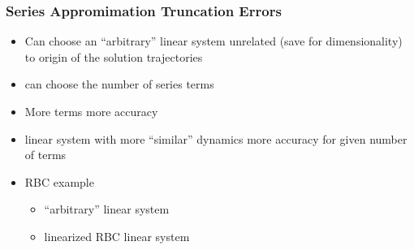 \documentclass{beamer}
\begin{document}
\begin{frame}
  \frametitle{Series Appromimation Truncation Errors}
  \begin{itemize}
  \item Can choose an ``arbitrary''  linear system unrelated (save for dimensionality) to origin of the solution trajectories
  \item can choose the number of series terms
  \item More terms more accuracy
  \item linear system with more ``similar'' dynamics more accuracy for given number of terms
  \item RBC example
    \begin{itemize}
    \item ``arbitrary'' linear system

  \item linearized RBC  linear system

    \end{itemize}

  \end{itemize}
\end{frame}
\end{document}
